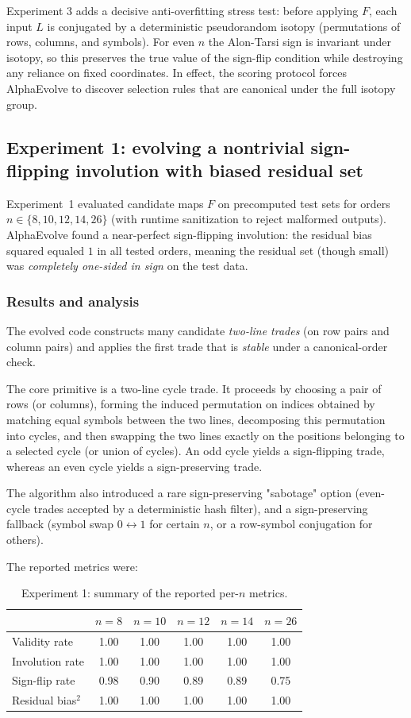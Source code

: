 \documentclass[11pt]{amsart}
\begin{document}
Experiment 3 adds a decisive anti-overfitting stress test: before applying $F$, each input $L$ is conjugated by a deterministic pseudorandom isotopy (permutations of rows, columns, and symbols).
For even $n$ the Alon-Tarsi sign is invariant under isotopy, so this preserves the true value of the sign-flip condition while destroying any reliance on fixed coordinates.
In effect, the scoring protocol forces AlphaEvolve to discover selection rules that are canonical under the full isotopy group.

\subsection{Experiment 1: evolving a nontrivial sign-flipping involution with biased residual set}
Experiment~1 evaluated candidate maps $F$ on precomputed test sets for orders $n\in\{8,10,12,14,26\}$ (with runtime sanitization to reject malformed outputs). AlphaEvolve found a near-perfect sign-flipping involution: the residual bias squared equaled $1$ in all tested orders, meaning the residual set (though small) was \emph{completely one-sided in sign} on the test data.

\subsubsection{Results and analysis}
The evolved code constructs many candidate \emph{two-line trades} (on row pairs and column pairs) and applies the first trade that is \emph{stable} under a canonical-order check.

The core primitive is a two-line cycle trade. It proceeds by choosing a pair of rows (or columns), forming the induced permutation on indices obtained by matching equal symbols between the two lines, decomposing this permutation into cycles, and then swapping the two lines exactly on the positions belonging to a selected cycle (or union of cycles). An odd cycle yields a sign-flipping trade, whereas an even cycle yields a sign-preserving trade.

The algorithm also introduced a rare sign-preserving "sabotage" option (even-cycle trades accepted by a deterministic hash filter), and a sign-preserving fallback (symbol swap $0\leftrightarrow 1$ for certain $n$, or a row-symbol conjugation for others).

The reported metrics were:

\begin{table}[h]
\centering
\begin{tabular}{@{}lccccc@{}}
\toprule
 & $n=8$ & $n=10$ & $n=12$ & $n=14$ & $n=26$ \\
\midrule
Validity rate & 1.00 & 1.00 & 1.00 & 1.00 & 1.00 \\
Involution rate & 1.00 & 1.00 & 1.00 & 1.00 & 1.00 \\
Sign-flip rate & 0.98 & 0.90 & 0.89 & 0.89 & 0.75 \\
Residual bias$^2$ & 1.00 & 1.00 & 1.00 & 1.00 & 1.00 \\
\bottomrule
\end{tabular}
\caption{Experiment 1: summary of the reported per-$n$ metrics.}
\end{table}
\end{document}
